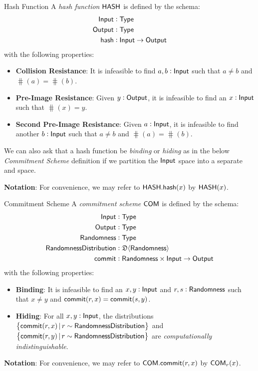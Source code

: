 \begin{definitiontoc}{Hash Function}
    A \emph{hash function} ${\textsf{HASH}}$ is defined by the schema:
    \begin{align*}
        {\textsf{Input}}  &: {\textsf{Type}} \\
        {\textsf{Output}} &: {\textsf{Type}} \\
        {\textsf{hash}}   &: {\textsf{Input}} \to {\textsf{Output}}
    \end{align*}
    with the following properties:
    \begin{itemize}
        \item \textbf{Collision Resistance}: It is infeasible to find $a, b : {\textsf{Input}}$ such that $a \ne b$ and $\hash(a) = \hash(b)$.
        \item \textbf{Pre-Image Resistance}: Given $y : {\textsf{Output}}$, it is infeasible to find an $x : {\textsf{Input}}$ such that $\hash(x) = y$.
        \item \textbf{Second Pre-Image Resistance}: Given $a : {\textsf{Input}}$, it is infeasible to find another $b : {\textsf{Input}}$ such that $a \ne b$ and $\hash(a) = \hash(b)$.
    \end{itemize}

    We can also ask that a hash function be \emph{binding} or \emph{hiding} as in the below \emph{Commitment Scheme} definition if we partition the ${\textsf{Input}}$ space into a separate \Randomness{} and \Input{} space.

    \textbf{Notation}: For convenience, we may refer to ${\textsf{HASH}}.{\textsf{hash}}(x)$ by ${\textsf{HASH}}(x)$.
\end{definitiontoc}

\begin{definitiontoc}{Commitment Scheme}
    A \emph{commitment scheme} ${\textsf{COM}}$ is defined by the schema:
    \begin{align*}
        {\textsf{Input}}                  &: {\textsf{Type}} \\
        {\textsf{Output}}                 &: {\textsf{Type}} \\
        {\textsf{Randomness}}             &: {\textsf{Type}} \\
        {\textsf{RandomnessDistribution}} &: \mathfrak{D}\langle{{\textsf{Randomness}}}\rangle \\
        {\textsf{commit}}                 &: {\textsf{Randomness}} \times {\textsf{Input}} \to {\textsf{Output}}
    \end{align*}
    with the following properties:
    \begin{itemize}
        \item \textbf{Binding}: It is infeasible to find an $x, y : {\textsf{Input}}$ and $r, s: {\textsf{Randomness}}$ such that $x \ne y$ and ${\textsf{commit}}(r,x) = {\textsf{commit}}(s,y)$.
        \item \textbf{Hiding}: For all $x, y : {\textsf{Input}}$, the distributions $\set{{\textsf{commit}}(r,x) \,|\, r \sim {\textsf{RandomnessDistribution}}}$ and \\ $\set{{\textsf{commit}}(r,y) \,|\, r \sim {\textsf{RandomnessDistribution}}}$ are \emph{computationally indistinguishable}.
    \end{itemize}

    \textbf{Notation}: For convenience, we may refer to ${\textsf{COM}}.{\textsf{commit}}(r,x)$ by ${\textsf{COM}}_r(x)$.
\end{definitiontoc}

